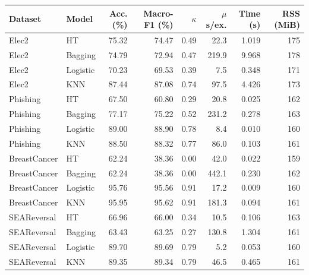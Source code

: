 \begin{tabular}{llrrrrrr}
\toprule
Dataset & Model & Acc. (\%) & Macro-F1 (\%) & $\kappa$ & $\mu$s/ex. & Time (s) & RSS (MiB) \\
\midrule
Elec2 & HT & 75.32 & 74.47 & 0.49 & 22.3 & 1.019 & 175 \\
Elec2 & Bagging & 74.79 & 72.94 & 0.47 & 219.9 & 9.968 & 178 \\
Elec2 & Logistic & 70.23 & 69.53 & 0.39 & 7.5 & 0.348 & 171 \\
Elec2 & KNN & 87.44 & 87.08 & 0.74 & 97.5 & 4.426 & 173 \\
Phishing & HT & 67.50 & 60.80 & 0.29 & 20.8 & 0.025 & 162 \\
Phishing & Bagging & 77.17 & 75.22 & 0.52 & 231.2 & 0.278 & 163 \\
Phishing & Logistic & 89.00 & 88.90 & 0.78 & 8.4 & 0.010 & 160 \\
Phishing & KNN & 88.50 & 88.32 & 0.77 & 86.0 & 0.103 & 161 \\
BreastCancer & HT & 62.24 & 38.36 & 0.00 & 42.0 & 0.022 & 159 \\
BreastCancer & Bagging & 62.24 & 38.36 & 0.00 & 442.1 & 0.230 & 162 \\
BreastCancer & Logistic & 95.76 & 95.56 & 0.91 & 17.2 & 0.009 & 160 \\
BreastCancer & KNN & 95.95 & 95.62 & 0.91 & 181.3 & 0.094 & 161 \\
SEAReversal & HT & 66.96 & 66.00 & 0.34 & 10.5 & 0.106 & 163 \\
SEAReversal & Bagging & 63.43 & 63.25 & 0.27 & 130.8 & 1.304 & 161 \\
SEAReversal & Logistic & 89.70 & 89.69 & 0.79 & 5.2 & 0.053 & 160 \\
SEAReversal & KNN & 89.35 & 89.34 & 0.79 & 46.5 & 0.465 & 161 \\
\bottomrule
\end{tabular}
